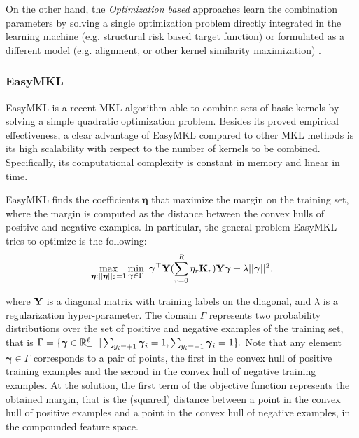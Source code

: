 \documentclass{esannV2}
\newcommand{\Real}{\mathbb{R}}
\newcommand{\KK}{{\bf K}}
\newcommand{\YY}{{\bf Y}}
\newcommand{\1}{{\bf 1}}
\begin{document}
On the other hand, the \emph{Optimization based} approaches learn the combination parameters by solving a single optimization problem directly integrated in the learning machine (e.g. structural risk based target function) or formulated as a different model (e.g. alignment, or other kernel similarity maximization) \cite{Rakotomamonjy2008,Bach2004,Varma2009}. %


\subsubsection{EasyMKL}
\label{EasyMKL}
EasyMKL \cite{Aiolli2015} is a recent MKL algorithm able to combine sets of basic kernels by solving a simple quadratic optimization problem. Besides its proved empirical effectiveness, a clear advantage of EasyMKL compared to other MKL methods is its high scalability with respect to the number of kernels to be combined. Specifically, its computational complexity is constant in memory and linear in time.

EasyMKL finds the coefficients $\boldsymbol{\eta}$ that maximize the margin on the training set, where the margin is computed as the distance between the convex hulls of positive and negative examples. In particular, the general problem EasyMKL tries to optimize is the following:
\vspace{-0.4cm}
\begin{equation}
\label{eq:easymklotig}
\max_{\boldsymbol{\eta}:||\boldsymbol{\eta}||_2=1} \min_{\boldsymbol{\gamma} \in \Gamma} \mbox { }  \boldsymbol{\gamma}^{\top} \YY ( \sum_{r=0}^R \eta_r \KK_r) \YY \boldsymbol{\gamma} + \lambda ||\boldsymbol{\gamma}||^2.
\end{equation}
\vspace{-0.3cm}

where $\YY$ is a diagonal matrix with training labels on the diagonal, and $\lambda$ is a regularization hyper-parameter. The domain $\Gamma$ represents two probability distributions over the set of positive and negative examples of the training set, that is $\Gamma = \{\boldsymbol{\gamma} \in \Real_+^{\ell} \hspace{0.2cm} |  \sum_{y_i = +1} \boldsymbol{\gamma}_i = 1 , \sum_{y_i = -1} \boldsymbol{\gamma}_i = 1\}.
$
Note that any element $\boldsymbol{\gamma} \in \Gamma$ corresponds to a pair of points, the first in the convex hull of positive training examples and the second in the convex hull of negative training examples.
At the solution, the first term of the objective function represents the obtained margin, that is the (squared) distance between a point in the convex hull of positive examples and a point in the convex hull of negative examples, in the compounded feature space.
\end{document}
